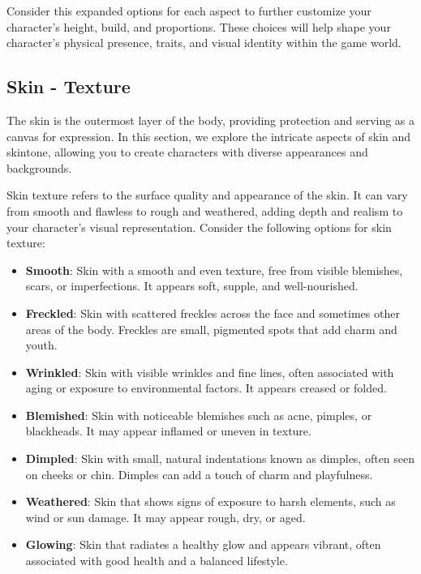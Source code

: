 \documentclass[12pt]{book}
\begin{document}
Consider this expanded options for each aspect to further customize your character's height, build, and proportions. These choices will help shape your character's physical presence, traits, and visual identity within the game world.

\subsection{\textbf{Skin  - Texture}}

The skin is the outermost layer of the body, providing protection and serving as a canvas for expression. In this section, we explore the intricate aspects of skin and skintone, allowing you to create characters with diverse appearances and backgrounds.

Skin texture refers to the surface quality and appearance of the skin. It can vary from smooth and flawless to rough and weathered, adding depth and realism to your character's visual representation. Consider the following options for skin texture:

\begin{itemize}
    \item \textbf{Smooth}: Skin with a smooth and even texture, free from visible blemishes, scars, or imperfections. It appears soft, supple, and well-nourished.
    \item \textbf{Freckled}: Skin with scattered freckles across the face and sometimes other areas of the body. Freckles are small, pigmented spots that add charm and youth.
    \item \textbf{Wrinkled}: Skin with visible wrinkles and fine lines, often associated with aging or exposure to environmental factors. It appears creased or folded.
    \item \textbf{Blemished}: Skin with noticeable blemishes such as acne, pimples, or blackheads. It may appear inflamed or uneven in texture.
    \item \textbf{Dimpled}: Skin with small, natural indentations known as dimples, often seen on cheeks or chin. Dimples can add a touch of charm and playfulness.
    \item \textbf{Weathered}: Skin that shows signs of exposure to harsh elements, such as wind or sun damage. It may appear rough, dry, or aged.
    \item \textbf{Glowing}: Skin that radiates a healthy glow and appears vibrant, often associated with good health and a balanced lifestyle.
\end{itemize}
\end{document}
